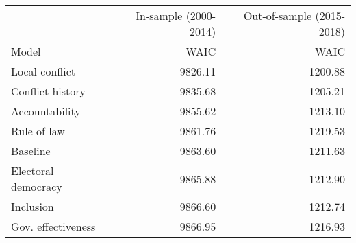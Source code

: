\begin{longtable}{lrr}
\toprule
 & In-sample (2000-2014) & Out-of-sample (2015-2018) \\ 
\cmidrule(lr){2-2} \cmidrule(lr){3-3}
Model & WAIC & WAIC \\ 
\midrule\addlinespace[2.5pt]
Local conflict & 9826.11 & 1200.88 \\ 
Conflict history & 9835.68 & 1205.21 \\ 
Accountability & 9855.62 & 1213.10 \\ 
Rule of law & 9861.76 & 1219.53 \\ 
Baseline & 9863.60 & 1211.63 \\ 
Electoral democracy & 9865.88 & 1212.90 \\ 
Inclusion & 9866.60 & 1212.74 \\ 
Gov. effectiveness & 9866.95 & 1216.93 \\ 
\bottomrule
\end{longtable}

